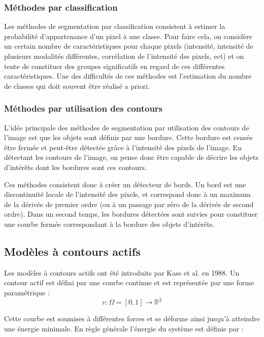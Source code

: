 \subsubsection*{Méthodes par classification}
Les méthodes de segmentation par classification consistent à estimer la probabilité d'appartenance d'un pixel à une classe. Pour faire cela, on considère un certain nombre de caractéristiques pour chaque pixels (intensité, intensité de plusieurs modalités différentes, corrélation de l'intensité des pixels, ect) et on tente de constituer des groupes significatifs en regard de ces différentes caractéristiques. Une des difficultés de ces méthodes est l'estimation du nombre de classes qui doit souvent être réalisé a priori.


\subsubsection*{Méthodes par utilisation des contours}

L'idée principale des méthodes de segmentation par utilisation des contours de l'image est que les objets sont définis par une bordure. Cette bordure est censée être fermée et peut-être détectée grâce à l'intensité des pixels de l'image. En détectant les contours de l'image, on pense donc être capable de décrire les objets d'intérêts dont les bordures sont ces contours.

Ces méthodes consistent donc à créer un détecteur de bords. Un bord est une discontinuité locale de l'intensité des pixels, et correspond donc à un maximum de la dérivée de premier ordre (ou à un passage par zéro de la dérivée de second ordre). Dans un second temps, les bordures détectées sont suivies pour constituer une courbe fermée correspondant à la bordure des objets d'intérêts.




\subsection{Modèles à contours actifs}

Les modèles à contours actifs ont été introduits par Kass et al. en 1988. Un contour actif est défini par une courbe continue et est représentée par une forme paramétrique :
\begin{equation*}
v : \Omega =[0,1] \rightarrow \mathbb{R}^2
\end{equation*}

Cette courbe est soumises à différentes forces et se déforme ainsi jusqu'à atteindre une énergie minimale. En règle générale l'énergie du système est définie par : 


